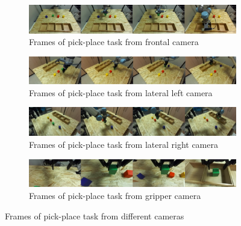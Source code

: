 \begin{figure}[htb]
    \centering
    \begin{subfigure}[b]{0.45\textwidth}
        \centering
        \includegraphics[width=\textwidth]{Figures/images/dataset_real_robot/frontal_camera.png}
        \caption{Frames of pick-place task from frontal camera}
        \label{fig:frontal_camera}
    \end{subfigure}
    \hspace{5px}
    \begin{subfigure}[b]{0.45\textwidth}
        \includegraphics[width=\textwidth]{Figures/images/dataset_real_robot/lateral_left.png}
        \caption{Frames of pick-place task from lateral left camera}
        \label{fig:lateral_left}
    \end{subfigure}
    \vfill
    \begin{subfigure}[b]{0.45\textwidth}
        \includegraphics[width=\textwidth]{Figures/images/dataset_real_robot/lateral_right.png}
        \caption{Frames of pick-place task from lateral right camera}
        \label{fig:lateral_right}
    \end{subfigure}
    \hspace{5px}
    \begin{subfigure}[b]{0.45\textwidth}
        \includegraphics[width=\textwidth]{Figures/images/dataset_real_robot/gripper_camera.png}
        \caption{Frames of pick-place task from gripper camera}
        \label{fig:gripper_camera}
    \end{subfigure}
    \caption{Frames of pick-place task from different cameras}
    \label{fig:real_dataset}
\end{figure}

